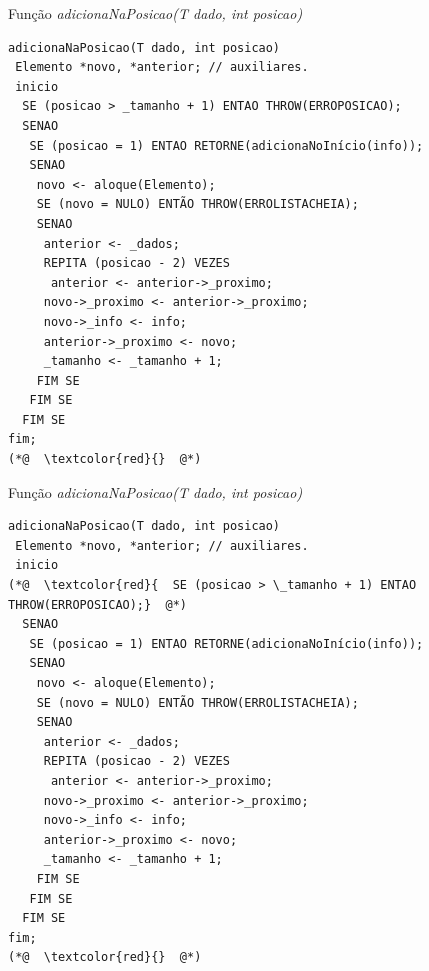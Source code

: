 \documentclass[12pt,table,xcolor={dvipsnames}]{beamer}
\begin{document}
\begin{frame}[fragile]{Função \textit{adicionaNaPosicao(T dado, int posicao)}}
\begin{lstlisting}
adicionaNaPosicao(T dado, int posicao)
 Elemento *novo, *anterior; // auxiliares.
 inicio
  SE (posicao > _tamanho + 1) ENTAO THROW(ERROPOSICAO);
  SENAO
   SE (posicao = 1) ENTAO RETORNE(adicionaNoInício(info));
   SENAO
    novo <- aloque(Elemento);
    SE (novo = NULO) ENTÃO THROW(ERROLISTACHEIA);
    SENAO
     anterior <- _dados;
     REPITA (posicao - 2) VEZES
      anterior <- anterior->_proximo;
     novo->_proximo <- anterior->_proximo;
     novo->_info <- info;
     anterior->_proximo <- novo;
     _tamanho <- _tamanho + 1;
    FIM SE
   FIM SE
  FIM SE
fim;
(*@  \textcolor{red}{}  @*)
\end{lstlisting}
\end{frame}

\begin{frame}[fragile]{Função \textit{adicionaNaPosicao(T dado, int posicao)}}
\begin{lstlisting}
adicionaNaPosicao(T dado, int posicao)
 Elemento *novo, *anterior; // auxiliares.
 inicio
(*@  \textcolor{red}{  SE (posicao > \_tamanho + 1) ENTAO THROW(ERROPOSICAO);}  @*)
  SENAO
   SE (posicao = 1) ENTAO RETORNE(adicionaNoInício(info));
   SENAO
    novo <- aloque(Elemento);
    SE (novo = NULO) ENTÃO THROW(ERROLISTACHEIA);
    SENAO
     anterior <- _dados;
     REPITA (posicao - 2) VEZES
      anterior <- anterior->_proximo;
     novo->_proximo <- anterior->_proximo;
     novo->_info <- info;
     anterior->_proximo <- novo;
     _tamanho <- _tamanho + 1;
    FIM SE
   FIM SE
  FIM SE
fim;
(*@  \textcolor{red}{}  @*)
\end{lstlisting}
\end{frame}
\end{document}
